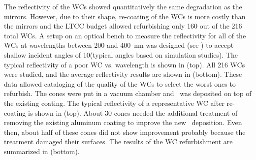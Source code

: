 The reflectivity of the WCs showed quantitatively the same degradation as the mirrors. However, due to their shape,
re-coating of the WCs is more costly than the mirrors and the LTCC budget allowed refurbishing only 160 out of the
216 total WCs. A setup on an optical bench to measure the reflectivity for all of the WCs at wavelengths between 200
and 400~nm was designed (see ) to accept shallow incident angles of 10\mdeg (typical angles
based on simulation studies). The typical reflectivity of a poor WC vs. wavelength is shown in 
(top). All 216 WCs were studied, and the average reflectivity results are shown in  (bottom). These
data allowed cataloging of the quality of the WCs to select the worst ones to refurbish. The cones were put in a vacuum
chamber and \coating\ was deposited on top of the existing coating. The typical reflectivity of a representative WC
after re-coating is shown in  (top). About 30 cones needed the additional treatment of removing the
existing aluminum coating to improve the new \coating\ deposition. Even then, about half of these cones did not show
improvement probably because the treatment damaged their surfaces. The results of the WC refurbishment are
summarized in  (bottom).

